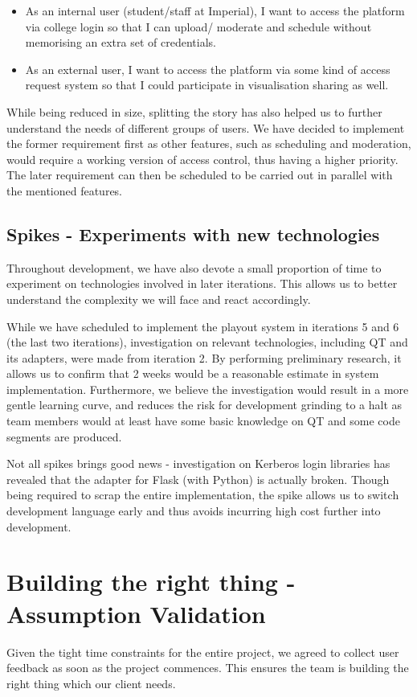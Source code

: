 \documentclass[a4paper]{article}
\begin{document}
\begin{itemize}
  \item As an internal user (student/staff at Imperial), I want to access the 
        platform via college login so that I can upload/ moderate and schedule
        without memorising an extra set of credentials.
  \item As an external user, I want to access the platform via some kind
        of access request system so that I could participate in visualisation
        sharing as well. 
\end{itemize}

While being reduced in size, splitting the story has also helped us to 
further understand the needs
of different groups of users. We have decided to implement the former requirement
first as other features, such as scheduling and moderation, would require
a working version of access control, thus having a higher priority.
The later requirement can then be scheduled
to be carried out in parallel with the mentioned features.

\subsection{Spikes - Experiments with new technologies}
Throughout development, we have also devote a small proportion of time to
experiment on technologies involved in later iterations. This allows us to
better understand the complexity we will face and react accordingly.

While we have scheduled to implement the playout system in iterations 5 and 6
(the last two iterations),
investigation on relevant technologies, including QT and its adapters, were
made from iteration 2. By performing preliminary research, it allows 
us to confirm that 2 weeks would be a reasonable estimate in system 
implementation. Furthermore, we believe the investigation would result 
in a more gentle learning curve, and reduces the risk for development 
grinding to a halt as team members would
at least have some basic knowledge on QT and some code segments are produced.

Not all spikes brings good news - investigation on Kerberos login libraries has
revealed that the adapter for Flask (with Python) is actually broken.
Though being required to scrap the entire implementation, the spike allows us
to switch development language early and thus avoids incurring high 
cost further into development.

\section{Building the right thing - Assumption Validation}
Given the tight time constraints for the entire project, we agreed to collect
user feedback as soon as the project commences. This ensures the team
is building the right thing which our client needs.
\end{document}

